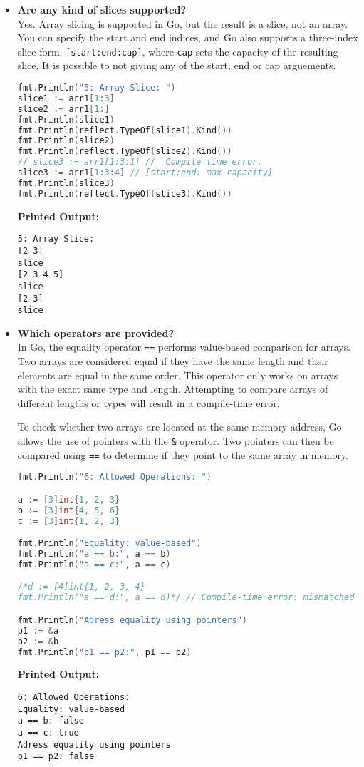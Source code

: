 \documentclass{article}
\begin{document}
\begin{itemize}
\item \textbf{Are any kind of slices supported?} \\
Yes. Array slicing is supported in Go, but the result is a slice, not an array. You can specify the start and end indices, and Go also supports a three-index slice form: \texttt{[start:end:cap]}, where \texttt{cap} sets the capacity of the resulting slice. It is possible to not giving any of the start, end or cap arguements.
\begin{lstlisting}[language=Go]
fmt.Println("5: Array Slice: ")
slice1 := arr1[1:3]
slice2 := arr1[1:] 
fmt.Println(slice1)
fmt.Println(reflect.TypeOf(slice1).Kind())
fmt.Println(slice2)
fmt.Println(reflect.TypeOf(slice2).Kind())
// slice3 := arr1[1:3:1] //  Compile time error.
slice3 := arr1[1:3:4] // [start:end: max capacity]
fmt.Println(slice3)
fmt.Println(reflect.TypeOf(slice3).Kind())
\end{lstlisting}
\textbf{Printed Output:}
\begin{verbatim}
5: Array Slice: 
[2 3]
slice
[2 3 4 5]
slice
[2 3]
slice
\end{verbatim}


\item \textbf{Which operators are provided?} \\
In Go, the equality operator \texttt{==} performs value-based comparison for arrays. Two arrays are considered equal if they have the same length and their elements are equal in the same order. This operator only works on arrays with the exact same type and length. Attempting to compare arrays of different lengths or types will result in a compile-time error.

To check whether two arrays are located at the same memory address, Go allows the use of pointers with the \texttt{\&} operator. Two pointers can then be compared using \texttt{==} to determine if they point to the same array in memory.

\begin{lstlisting}[language=Go]
fmt.Println("6: Allowed Operations: ")

a := [3]int{1, 2, 3}
b := [3]int{4, 5, 6}
c := [3]int{1, 2, 3}

fmt.Println("Equality: value-based")
fmt.Println("a == b:", a == b) 
fmt.Println("a == c:", a == c)

/*d := [4]int{1, 2, 3, 4}
fmt.Println("a == d:", a == d)*/ // Compile-time error: mismatched types

fmt.Println("Adress equality using pointers")
p1 := &a
p2 := &b
fmt.Println("p1 == p2:", p1 == p2)
\end{lstlisting}
\textbf{Printed Output:}
\begin{verbatim}
6: Allowed Operations: 
Equality: value-based
a == b: false
a == c: true
Adress equality using pointers
p1 == p2: false
\end{verbatim}
\end{itemize}
\newpage
\end{document}
